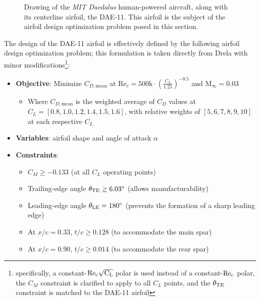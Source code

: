 \documentclass[conf]{new-aiaa}
\begin{document}
    \begin{figure}[h]
        \centering
        
        \caption{Drawing of the \emph{MIT Daedalus} human-powered aircraft, along with its centerline airfoil, the DAE-11. This airfoil is the subject of the airfoil design optimization problem posed in this section.}
        \label{fig:daedalus_iso}
    \end{figure}

    The design of the DAE-11 airfoil is effectively defined by the following airfoil design optimization problem; this formulation is taken directly from Drela \cite{drela_pros_1998} with minor modifications\footnote{specifically, a constant-$\rm Re_c \sqrt{C_L}$ polar is used instead of a constant-$\rm Re_c$ polar, the $C_M$ constraint is clarified to apply to all $C_L$ points, and the $\theta_{\rm TE}$ constraint is matched to the DAE-11 airfoil}:

    \begin{itemize}
        \item \textbf{Objective}: Minimize $C_{D, \mathrm{mean}}$ at $\mathrm{Re}_c = 500\mathrm{k} \cdot \left(\frac{C_L}{1.25}\right)^{-0.5}$ and $\mathrm{M}_\infty = 0.03$
        \begin{itemize}
            \item Where $C_{D, \mathrm{mean}}$ is the weighted average of $C_D$ values at $C_L = [0.8, 1.0, 1.2, 1.4, 1.5, 1.6]$, with relative weights of $[5, 6, 7, 8, 9, 10]$ at each respective $C_L$
        \end{itemize}
        \item \textbf{Variables}: airfoil shape and angle of attack $\alpha$
        \item \textbf{Constraints}:
        \begin{itemize}
            \item $C_M \geq -0.133$ (at all $C_L$ operating points)
            \item Trailing-edge angle $\theta_{\rm TE} \geq 6.03^\circ$ (allows manufacturability)
            \item Leading-edge angle $\theta_{\rm LE} = 180^\circ$ (prevents the formation of a sharp leading edge)
            \item At $x/c = 0.33$, $t/c \geq 0.128$ (to accommodate the main spar)
            \item At $x/c = 0.90$, $t/c \geq 0.014$ (to accommodate the rear spar)
        \end{itemize}
    \end{itemize}
\end{document}
